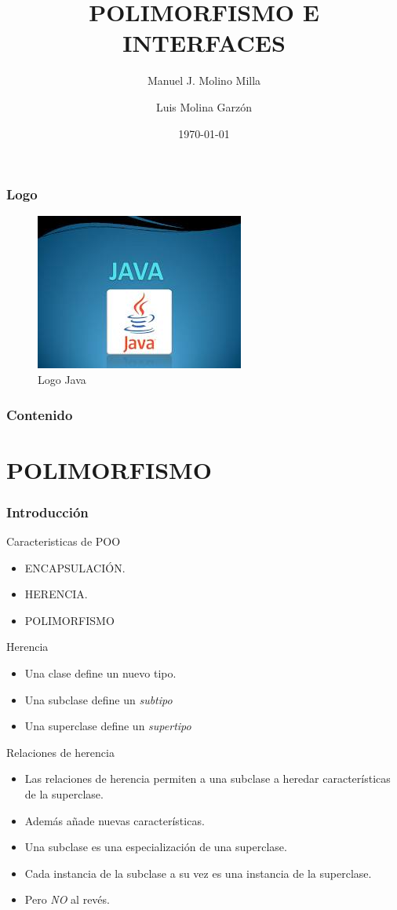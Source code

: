 \documentclass{beamer}
\title{POLIMORFISMO E INTERFACES}
\author{Manuel J. Molino Milla \and Luis Molina Garzón}
\date{\today} %
\institute{IES Virgen del Carmen \and Departamento de Informática}
\begin{document}
\begin{frame}
  \titlepage
\end{frame}

\begin{frame}
    \frametitle{Logo}
\begin{figure}
\includegraphics[scale=1]{imagenes/logo.jpeg} 
\caption{Logo Java}
\end{figure}
\end{frame}

\begin{frame}
  \frametitle{Contenido}
  \tableofcontents[pausesections]
\end{frame}

\section{POLIMORFISMO}
\begin{frame}
\frametitle{Introducción}
\begin{scriptsize}
\begin{block}{Caracteristicas de POO}
\begin{itemize}[<+->]
\item ENCAPSULACIÓN.
\item HERENCIA.
\item POLIMORFISMO
\end{itemize}
\end{block}
\pause
\begin{block}{Herencia}
\begin{itemize}[<+->]
\item Una clase define un nuevo tipo.
\item Una subclase define un \emph{subtipo}
\item Una superclase define un \emph{supertipo}
\end{itemize}
\end{block}
\pause
\begin{block}{Relaciones de herencia}
\begin{itemize}[<+->]
\item Las relaciones de herencia permiten a una subclase a heredar características de la superclase.
\item Además añade nuevas características.
\item Una subclase es una especialización de una superclase.
\item Cada instancia de la subclase a su vez es una instancia de la superclase.
\item Pero \emph{NO} al revés.
\end{itemize}
\end{block}
\end{scriptsize}
\end{frame}
\end{document}
